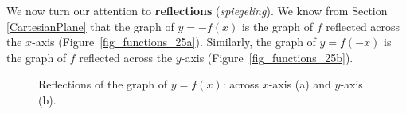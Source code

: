 We now turn our attention to \textbf{reflections} (\textit{spiegeling}). We know from Section \ref{CartesianPlane} that the graph of $y=-f(x)$ is the graph of $f$ reflected across the $x$-axis (Figure~\ref{fig_functions_25a}).  Similarly, the graph of $y=f(-x)$ is the graph of $f$ reflected across the $y$-axis (Figure~\ref{fig_functions_25b}).  


\begin{figure}[t]
\centering
\centerline{
\hspace{0.1cm}
}
\caption{Reflections of the graph of $y=f(x)$: across $x$-axis (a) and $y$-axis (b). }
\end{figure}


